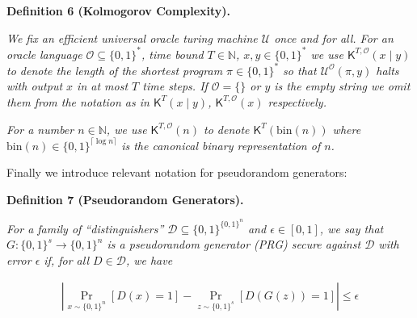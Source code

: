 \documentclass[10pt,a4paper]{article}
\begin{document}


\par\medskip\noindent\textbf{
\textbf{Definition 6}\textbf{ }(Kolmogorov Complexity)\textbf{.}
}\par



\emph{We fix an efficient universal oracle turing machine $\mathcal{U}$ once and for all. For an oracle language $\mathcal{O}\subseteq\{0,1\}^{*}$, time bound $T\in\mathbb{N}$, $x,y\in\{0,1\}^{*}$ we use ${\mathsf{K}}^{T,\mathcal{O}}(x\mid y)$ to denote the length of the shortest program $\pi\in\{0,1\}^{*}$ so that $\mathcal{U}^{\mathcal{O}}(\pi,y)$ halts with output $x$ in at most $T$ time steps. If $\mathcal{O}=\{\}$ or $y$ is the empty string we omit them from the notation as in ${\mathsf{K}}^{T}(x\mid y)$, ${\mathsf{K}}^{T,\mathcal{O}}(x)$ respectively.}\par




\emph{For a number $n\in\mathbb{N}$, we use ${\mathsf{K}}^{T,\mathcal{O}}(n)$ to denote ${\mathsf{K}}^{T}(\mathrm{bin}(n))$ where $\mathrm{bin}(n)\in\{0,1\}^{\lceil\log n\rceil}$ is the canonical binary representation of $n$.}\par






Finally we introduce relevant notation for pseudorandom generators:\par





\par\medskip\noindent\textbf{
\textbf{Definition 7}\textbf{ }(Pseudorandom Generators)\textbf{.}
}\par



\emph{For a family of “distinguishers” $\mathcal{D}\subseteq\{0,1\}^{\{0,1\}^{n}}$ and $\epsilon\in[0,1]$, we say that $G:\{0,1\}^{s}\to\{0,1\}^{n}$ is a pseudorandom generator (PRG) secure against $\mathcal{D}$ with error $\epsilon$ if, for all $D\in\mathcal{D}$, we have}\par


\[\begin{gathered}
|\Pr_{x\sim\{0,1\}^{n}}[D(x)=1]-\Pr_{z\sim\{0,1\}^{s}}[D(G(z))=1]|\leq\epsilon
\end{gathered}\]
\end{document}
